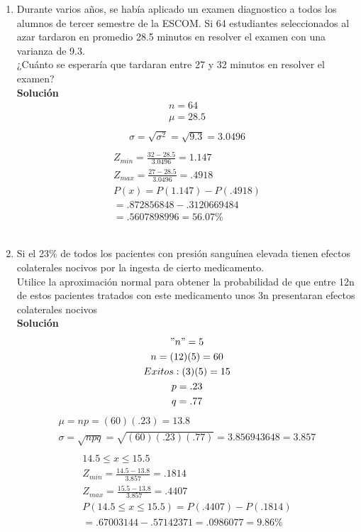 \begin{enumerate}
    \item Durante varios años, se había aplicado un examen diagnostico a todos los alumnos de tercer semestre de la ESCOM. Si 64 estudiantes seleccionados al azar tardaron en promedio 28.5 minutos en resolver el examen con una varianza de 9.3.\\
    ¿Cuánto se esperaría que tardaran entre 27 y 32 minutos en resolver el examen?
    \\\textbf{Solución}
    \begin{gather*}
    n	= 64\\
    \mu = 28.5\\		 
    \end{gather*}
    \begin{gather*}
    \sigma = \sqrt{\sigma^{2}} = \sqrt{9.3} = 3.0496\\
    \end{gather*}
    \begin{gather*}	 
    Z_{min} = \frac{32 - 28.5}{3.0496} = 1.147\\
    Z_{max} = \frac{27 - 28.5}{3.0496} = .4918\\
    P(x) = P(1.147) - P(.4918)\\ = .872856848 - .3120669484\\ = .5607898996 = 56.07\%
    \end{gather*}\\
    \item Si el 23\% de todos los pacientes con presión sanguínea elevada tienen efectos colaterales nocivos por la ingesta de cierto medicamento.\\
    Utilice la aproximación normal para obtener la probabilidad de que entre 12n de estos pacientes tratados con este medicamento unos 3n presentaran efectos colaterales nocivos
    \\\textbf{Solución}
    \begin{gather*}
    "n" = 5\\
    n	= (12)(5) = 60\\
    Exitos : (3)(5) = 15\\
    p = .23\\
    q = .77\\		 
    \end{gather*}
    \begin{gather*}
    \mu = np = (60)(.23) = 13.8\\
    \sigma = \sqrt{npq} = \sqrt{(60)(.23)(.77)} = 3.856943648 = 3.857\\
    \end{gather*}
    \begin{gather*}	 
    14.5 \le x \le 15.5\\	
    Z_{min} = \frac{14.5 - 13.8}{3.857} = .1814\\
    Z_{max} = \frac{15.5 - 13.8}{3.857} = .4407\\
    P(14.5 \le x \le 15.5) =  P(.4407) - P(.1814)\\ = .67003144 - .57142371 = .0986077 = 9.86\%
    \end{gather*}
    
\end{enumerate}
